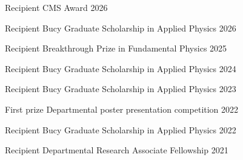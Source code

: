



\begin{cvhonors}

  \cvhonor
    {Recipient} %
    {CMS Award} %
    {} %
    {2026} %

  \cvhonor
    {Recipient} %
    {Bucy Graduate Scholarship in Applied Physics} %
    {} %
    {2026} %

  \cvhonor
    {Recipient} %
    {Breakthrough Prize in Fundamental Physics} %
    {} %
    {2025} %

  \cvhonor
    {Recipient} %
    {Bucy Graduate Scholarship in Applied Physics} %
    {} %
    {2024} %

  \cvhonor
    {Recipient} %
    {Bucy Graduate Scholarship in Applied Physics} %
    {} %
    {2023} %

  \cvhonor
    {First prize} %
    {Departmental poster presentation competition} %
    {} %
    {2022} %

  \cvhonor
    {Recipient} %
    {Bucy Graduate Scholarship in Applied Physics} %
    {} %
    {2022} %

  \cvhonor
    {Recipient} %
    {Departmental Research Associate Fellowship} %
    {} %
    {2021} %


\end{cvhonors}
